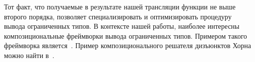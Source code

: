 Тот факт, что получаемые в результате нашей трансляции функции не выше второго порядка, позволяет специализировать и оптимизировать процедуру вывода ограниченных типов. В контексте нашей работы, наиболее интересны композициональные фреймворки вывода ограниченных типов. Примером такого фреймворка является~\cite{zhu2013compositional}. Пример композиционального решателя дизъюнктов Хорна можно найти в~\cite{komuravelli2016smt}.
